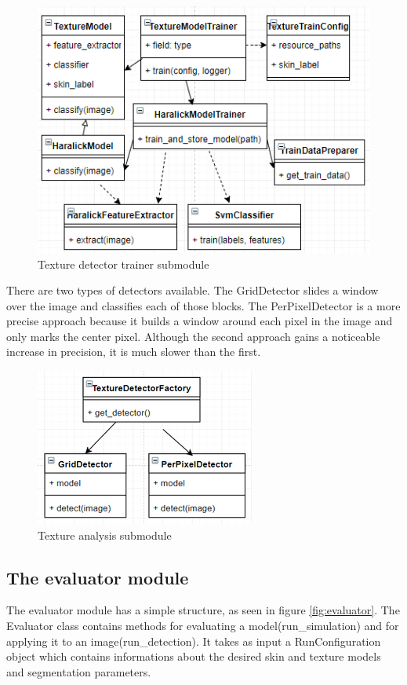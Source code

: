 \documentclass[12pt]{report}
\begin{document}
	\begin{figure}[h!]
		\centering
		\includegraphics[]{design/texture_train.png}
		\caption{Texture detector trainer submodule}
		\label{fig:texture_train}
	\end{figure}

	There are two types of detectors available. The GridDetector slides a window over the image and classifies each of those blocks. The PerPixelDetector is a more precise approach because it builds a window around each pixel in the image and only marks the center pixel. Although the second approach gains a noticeable increase in precision, it is much slower than the first.

	\begin{figure}[h!]
		\centering
		\includegraphics[]{design/texture_detect.png}
		\caption{Texture analysis submodule}
		\label{fig:texture_detect}
	\end{figure}
	
	\subsection{The evaluator module}
	
	The evaluator module has a simple structure, as seen in figure \ref{fig:evaluator}. The Evaluator class contains methods for evaluating a model(run\_simulation) and for applying it to an image(run\_detection). It takes as input a RunConfiguration object which contains informations about the desired skin and texture models and segmentation parameters.
	
\end{document}
